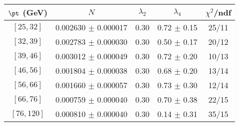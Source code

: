\begin{tabular}{c||c|c|c|c}
$\pt$ (GeV) & $N$ & $\lambda_{2}$ & $\lambda_4$  & $\chi^2$/ndf  \\
\hline
$[25, 32]$ & 0.002630 $\pm$ 0.000017 & 0.30 & 0.72 $\pm$ 0.15 & 25/11\\
$[32, 39]$ & 0.002783 $\pm$ 0.000030 & 0.30 & 0.50 $\pm$ 0.17 & 20/12\\
$[39, 46]$ & 0.003012 $\pm$ 0.000049 & 0.30 & 0.72 $\pm$ 0.20 & 10/13\\
$[46, 56]$ & 0.001804 $\pm$ 0.000038 & 0.30 & 0.68 $\pm$ 0.20 & 13/14\\
$[56, 66]$ & 0.001660 $\pm$ 0.000057 & 0.30 & 0.73 $\pm$ 0.30 & 12/14\\
$[66, 76]$ & 0.000759 $\pm$ 0.000040 & 0.30 & 0.70 $\pm$ 0.38 & 22/15\\
$[76, 120]$ & 0.000810 $\pm$ 0.000040 & 0.30 & 0.14 $\pm$ 0.31 & 35/15\\
\end{tabular}
